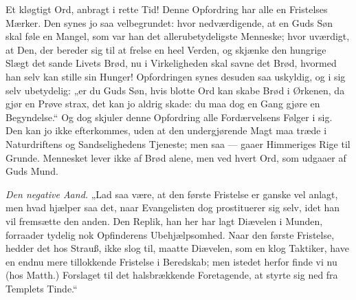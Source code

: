 \documentclass[12pt,a4paper]{book}
\begin{document}
Et kløgtigt Ord, anbragt i rette Tid! Denne Opfordring har alle en Fristelses Mærker. Den
synes jo saa velbegrundet: hvor nedværdigende, at en Guds Søn skal føle en Mangel, som var
han det allerubetydeligste Menneske; hvor uværdigt, at Den, der bereder sig til at frelse
en heel Verden, og skjænke den hungrige Slægt det sande Livets Brød, nu i Virkeligheden
skal savne det Brød, hvormed han selv kan stille sin Hunger! Opfordringen synes desuden
saa uskyldig, og i sig selv ubetydelig: „er du Guds Søn, hvis blotte Ord kan skabe Brød i
Ørkenen, da gjør en Prøve strax, det kan jo aldrig skade: du maa dog en Gang gjøre en
Begyndelse.“ Og dog skjuler denne Opfordring alle Fordærvelsens Følger i sig. Den kan jo
ikke efterkommes, uden at den undergjørende Magt maa træde i Naturdriftens og
Sandselighedens Tjeneste; men saa --- gaaer Himmeriges Rige til Grunde. {\large Mennesket
lever ikke af Brød alene, men ved hvert Ord, som udgaaer af Guds Mund.}

\emph{Den negative Aand.} „Lad saa være, at den første Fristelse er ganske vel anlagt, men
hvad hjælper saa det, naar Evangelisten dog prostituerer sig selv, idet han vil fremsætte
den anden. Den Replik, han her har lagt Diævelen i Munden, forraader tydelig nok
Opfinderens Ubehjælpsomhed. Naar den første Fristelse, hedder det hos Strauß, ikke slog
til, maatte Diævelen, som en klog Taktiker, have en endnu mere tillokkende Fristelse i
Beredskab; men istedet herfor finde vi nu (hos Matth.) Forslaget til det halsbrækkende
Foretagende, at styrte sig ned fra Templets Tinde.“
\end{document}

